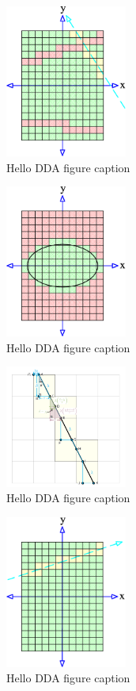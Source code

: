 	\begin{figure}
	  \centering
	  \includegraphics[width=4cm]{Space_Carving_3.png}
	  \caption{Hello DDA figure caption}\label{fig:SC-three-figsA}
	\end{figure}
	\begin{figure}
	  \centering
	  \includegraphics[width=4cm]{Space_Carving_4.png}
	  \caption{Hello DDA figure caption}\label{fig:SC-four-figsA}
	\end{figure}
	\begin{figure}
	  \centering
	  \includegraphics[width=4cm]{DDA.png}
	  \caption{Hello DDA figure caption}\label{fig:DDA-figsB}
	\end{figure}
	\begin{figure}
	  \centering
	  \includegraphics[width=4cm]{Space_Carving_1.png}
	  \caption{Hello DDA figure caption }\label{fig:SC-one-figsB}
	\end{figure}
